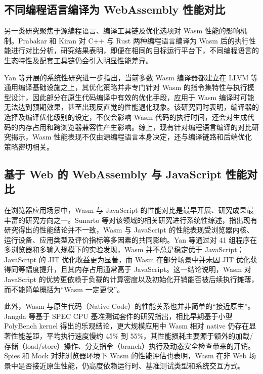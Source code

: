 \subsection{不同编程语言编译为 WebAssembly 性能对比}

另一类研究聚焦于源编程语言、编译工具链及优化选项对 Wasm 性能的影响机制。Prabakar 和 Kiran 对 C++ 与 Rust 两种编程语言编译为 Wasm 后的执行性能进行对比分析，研究结果表明，即便在相同的目标运行平台下，不同编程语言的生态特性及配套工具链仍会引入明显性能差异\cite{prabakar2024webassembly}。

Yan 等开展的系统性研究进一步指出，当前多数 Wasm 编译器都建立在 LLVM 等通用编译基础设施之上，其优化策略并非专门针对 Wasm 的指令集特性与执行模型设计，因此部分在原生代码编译中有效的优化手段，应用于 Wasm 编译时可能无法达到预期效果，甚至出现反直觉的性能退化现象\cite{yan2021understanding}。该研究同时表明，编译器的选择及编译优化级别的设定，不仅会影响 Wasm 代码的执行时间，还会对生成代码的内存占用和跨浏览器兼容性产生影响。综上，现有针对编程语言编译的对比研究揭示，Wasm 性能表现不仅由源编程语言本身决定，还与编译链路和后端优化策略密切相关。


\subsection{基于 Web 的 WebAssembly 与 JavaScript 性能对比}

在浏览器应用场景中，Wasm 与 JavaScript 的性能对比是最早开展、研究成果最丰富的研究方向之一。Sunarto 等对该领域的相关研究进行系统性综述，指出现有研究得出的性能结论并不一致，Wasm 与 JavaScript 的性能表现受浏览器内核、运行设备、应用类型及评价指标等多因素的共同影响\cite{sunarto2023systematic}。Yan 等通过对 41 组程序在多浏览器和多输入规模下的实验发现，Wasm 并不总是稳定优于 JavaScript；JavaScript 的 JIT 优化收益更为显著，而 Wasm 在部分场景中并未因 JIT 优化获得同等幅度提升，且其内存占用通常高于 JavaScript\cite{yan2021understanding}。这一结论说明，Wasm 对 JavaScript 的优势更依赖于负载的计算密度以及初始化开销能否被后续执行摊薄，而不能简单概括为“Wasm 一定更快”。

此外，Wasm 与原生代码（Native Code）的性能关系也并非简单的“接近原生”。Jangda 等基于 SPEC CPU 基准测试套件的研究指出，相比早期基于小型 PolyBench kernel 得出的乐观结论，更大规模应用中 Wasm 相对 native 仍存在显著性能差距，平均执行速度慢约 45\% 到 55\%，其性能损耗主要源于额外的加载/存储（load/store）操作、分支指令（branch）执行及动态安全检查带来的开销\cite{jangda2021not}。Spies 和 Mock 对非浏览器环境下 Wasm 的性能评估也表明，Wasm 在非 Web 场景中是否接近原生性能，仍高度依赖运行时、基准测试类型和系统交互方式\cite{spies2021evaluation}。


